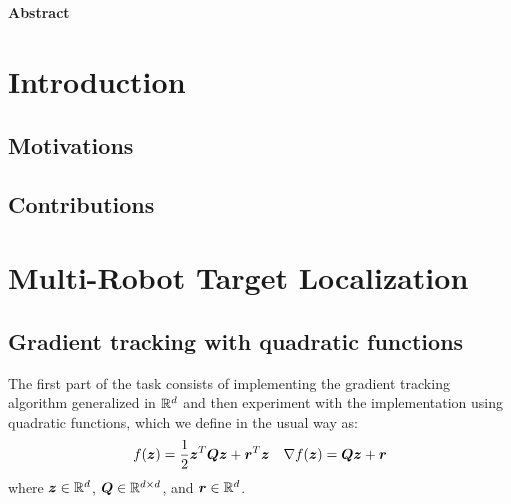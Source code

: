 \documentclass[a4paper,11pt,oneside]{book}
\begin{document}
\newpage
\thispagestyle{empty}

\begin{center}
\chapter*{}
\thispagestyle{empty}
{\Huge \textbf{Abstract}}\\
\vspace{15mm}
\end{center}

\tableofcontents \thispagestyle{empty}

\chapter*{Introduction}
\section*{Motivations} 

\section*{Contributions}


\chapter{Multi-Robot Target Localization}

\section{Gradient tracking with quadratic functions}

The first part of the task consists of implementing the gradient tracking algorithm generalized in ${\mathbb{R}}^d$ and then experiment with the implementation using quadratic functions, which we define in the usual way as:
\[
      f({\bm{z}}) = \frac{1}{2} {\bm{z}}^T {\bm{Q}} {\bm{z}} + {\bm{r}}^T {\bm{z}}
      \quad
      \nabla f({\bm{z}}) = {\bm{Q}} {\bm{z}} + {\bm{r}}
\]
where ${\bm{z}} \in {\mathbb{R}}^{d}$, ${\bm{Q}} \in {\mathbb{R}}^{d \times d}$, and ${\bm{r}} \in {\mathbb{R}}^{d}$.
\end{document}
